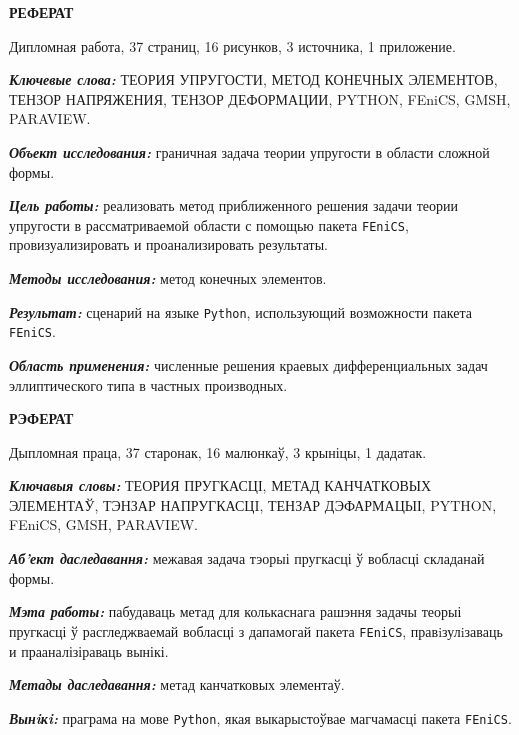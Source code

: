\documentclass[a4paper, 14pt]{extreport}
\begin{document}
\clearpage
\setcounter{page}{2}

\tableofcontents



\newpage
{}
\begin{center}
	\Large{\textbf{РЕФЕРАТ}}
\end{center}

Дипломная работа, 37 страниц, 16 рисунков, 3 источника, 1 приложение.

\textbf{\textit{Ключевые слова:}} ТЕОРИЯ УПРУГОСТИ, МЕТОД КОНЕЧНЫХ 
ЭЛЕМЕНТОВ, ТЕНЗОР НАПРЯЖЕНИЯ, ТЕНЗОР ДЕФОРМАЦИИ, PYTHON, FEniCS, 
GMSH, PARAVIEW.

\textbf{\textit{Объект исследования:}} граничная задача теории 
упругости в области сложной формы.

\textbf{\textit{Цель работы:}} реализовать метод приближенного решения
задачи теории упругости в рассматриваемой области с помощью пакета
\texttt{FEniCS}, провизуализировать и проанализировать результаты.

\textbf{\textit{Методы исследования:}} метод конечных элементов.

\textbf{\textit{Результат:}} сценарий на языке \texttt{Python},
использующий возможности пакета \texttt{FEniCS}.

\textbf{\textit{Область применения:}} численные решения краевых 
дифференциальных задач эллиптического типа в частных производных.

\begin{center}
	\Large{\textbf{РЭФЕРАТ}}
\end{center}

Дыпломная праца, 37 старонак, 16 малюнкаў, 3 крыніцы, 1 дадатак.

\textbf{\textit{Ключавыя словы:}} ТЕОРИЯ ПРУГКАСЦІ, МЕТАД КАНЧАТКОВЫХ \\
ЭЛЕМЕНТАЎ, ТЭНЗАР НАПРУГКАСЦI, ТЕНЗАР ДЭФАРМАЦЫІ, PYTHON, \\ FEniCS, 
GMSH, PARAVIEW.

\textbf{\textit{Аб'ект даследавання:}} межавая задача тэорыі 
пругкасці ў вобласці складанай формы.

\textbf{\textit{Мэта работы:}} пабудаваць метад для колькаснага 
рашэння задачы теорыі пругкасці ў расгледжваемай вобласці з
дапамогай пакета \texttt{FEniCS}, правiзулiзаваць и прааналізіраваць вынікі.

\textbf{\textit{Метады даследавання:}} метад канчатковых элементаў.

\textbf{\textit{Вынiкi:}} праграма на мове \texttt{Python},
якая выкарыстоўвае магчамасці пакета \texttt{FEniCS}.
\end{document}
